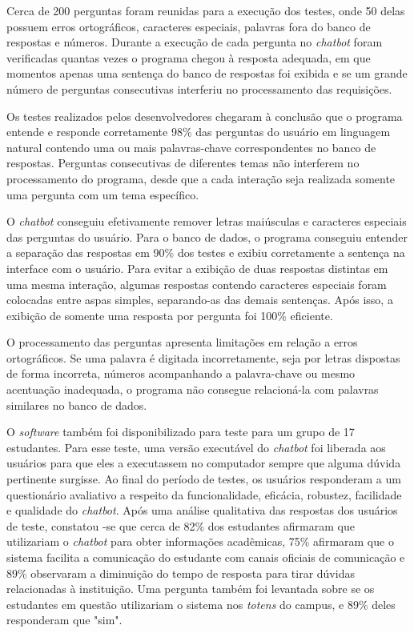 \documentclass[12pt]{article}
\begin{document}
Cerca de 200 perguntas foram reunidas para a execução dos testes, onde 50 delas possuem erros ortográficos, caracteres especiais, palavras fora do banco de respostas e números. Durante a execução de cada pergunta no {\itshape chatbot} foram verificadas quantas vezes o programa chegou à resposta adequada, em que momentos apenas uma sentença do banco de respostas foi exibida e se um grande número de perguntas consecutivas interferiu no processamento das requisições.

Os testes realizados pelos desenvolvedores chegaram à conclusão que o programa entende e responde corretamente 98\% das perguntas do usuário em linguagem natural contendo uma ou mais palavras-chave correspondentes no banco de respostas. Perguntas consecutivas de diferentes temas não interferem no processamento do programa, desde que a cada interação seja realizada somente uma pergunta com um tema específico.

O {\itshape chatbot} conseguiu efetivamente remover letras maiúsculas e caracteres especiais das perguntas do usuário. Para o banco de dados, o programa conseguiu entender a separação das respostas em 90\% dos testes e exibiu corretamente a sentença na interface com o usuário. Para evitar a exibição de duas respostas distintas em uma mesma interação, algumas respostas contendo caracteres especiais foram colocadas entre aspas simples, separando-as das demais sentenças. Após isso, a exibição de somente uma resposta por pergunta foi 100\% eficiente.

O processamento das perguntas apresenta limitações em relação a erros ortográficos. Se uma palavra é digitada incorretamente, seja por letras dispostas de forma incorreta, números acompanhando a palavra-chave ou mesmo acentuação inadequada, o programa não consegue relacioná-la com palavras similares no banco de dados.

O {\itshape software} também foi disponibilizado para teste para um grupo de 17 estudantes. Para esse teste, uma versão executável do {\itshape chatbot} foi  liberada aos usuários para que eles a executassem no computador sempre que alguma dúvida pertinente surgisse. Ao final do período de testes, os usuários responderam a um questionário avaliativo a respeito da funcionalidade, eficácia, robustez, facilidade e qualidade do {\itshape chatbot}. Após uma análise qualitativa das respostas dos usuários de teste, constatou -se que cerca de 82\% dos estudantes afirmaram que utilizariam o {\itshape chatbot} para obter informações acadêmicas, 75\% afirmaram que o sistema facilita a comunicação do estudante com canais oficiais de comunicação e 89\% observaram a diminuição do tempo de resposta para tirar dúvidas relacionadas à instituição. Uma pergunta também foi levantada sobre se os estudantes em questão utilizariam o sistema nos {\itshape totens} do campus, e 89\% deles responderam que "sim".
\end{document}

